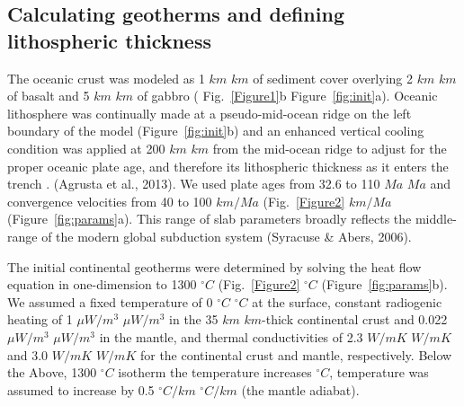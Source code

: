 \documentclass[draft,linenumbers]{agujournal2018} %
\providecommand{\DIFaddtex}[1]{{\protect\color{blue} \sf #1}} %
\providecommand{\DIFdeltex}[1]{{\protect\color{red} \scriptsize #1}} %
\providecommand{\DIFaddbegin}{} %
\providecommand{\DIFaddend}{} %
\providecommand{\DIFdelbegin}{} %
\providecommand{\DIFdelend}{} %
\providecommand{\DIFadd}[1]{\texorpdfstring{\DIFaddtex{#1}}{#1}} %
\providecommand{\DIFdel}[1]{\texorpdfstring{\DIFdeltex{#1}}{}} %
\newcommand{\DIFscaledelfig}{0.3}
\newlength{\DIFdelgraphicswidth} %
\newlength{\DIFdelgraphicsheight} %
\newcommand{\DIFaddincludegraphics}[2][]{{\color{blue}\fbox{\DIFOincludegraphics[#1]{#2}}}} %
\newcommand{\DIFdelincludegraphics}[2][]{%
\sbox{\DIFdelgraphicsbox}{\DIFOincludegraphics[#1]{#2}}%
\settoboxwidth{\DIFdelgraphicswidth}{\DIFdelgraphicsbox} %
\settoboxtotalheight{\DIFdelgraphicsheight}{\DIFdelgraphicsbox} %
\scalebox{\DIFscaledelfig}{%
\parbox[b]{\DIFdelgraphicswidth}{\usebox{\DIFdelgraphicsbox}\\[-\baselineskip] \rule{\DIFdelgraphicswidth}{0em}}\llap{\resizebox{\DIFdelgraphicswidth}{\DIFdelgraphicsheight}{%
\setlength{\unitlength}{\DIFdelgraphicswidth}%
\begin{picture}(1,1)%
\thicklines\linethickness{2pt} %
{\color[rgb]{1,0,0}\put(0,0){\framebox(1,1){}}}%
{\color[rgb]{1,0,0}\put(0,0){\line( 1,1){1}}}%
{\color[rgb]{1,0,0}\put(0,1){\line(1,-1){1}}}%
\end{picture}%
}\hspace*{3pt}}} %
} %
\DeclareRobustCommand{\DIFaddbegin}{\DIFOaddbegin \let\includegraphics\DIFaddincludegraphics} %
\DeclareRobustCommand{\DIFaddend}{\DIFOaddend \let\includegraphics\DIFOincludegraphics} %
\DeclareRobustCommand{\DIFdelbegin}{\DIFOdelbegin \let\includegraphics\DIFdelincludegraphics} %
\DeclareRobustCommand{\DIFdelend}{\DIFOaddend \let\includegraphics\DIFOincludegraphics} %
\begin{document}
\DIFaddend \subsection{Calculating geotherms and defining lithospheric thickness}
\DIFaddbegin

\DIFaddend The oceanic crust was modeled as 1 \DIFdelbegin \DIFdel{$km$ }\DIFdelend \DIFaddbegin \DIFadd{\(km\) }\DIFaddend of sediment cover overlying 2
\DIFdelbegin \DIFdel{$km$ }\DIFdelend \DIFaddbegin \DIFadd{\(km\) }\DIFaddend of basalt and 5 \DIFdelbegin \DIFdel{$km$ }\DIFdelend \DIFaddbegin \DIFadd{\(km\) }\DIFaddend of gabbro (\DIFdelbegin \DIFdel{Fig.~\ref{Figure1}b}\DIFdelend \DIFaddbegin \DIFadd{Figure~\ref{fig:init}a}\DIFaddend ).
Oceanic lithosphere was continually made at a pseudo-mid-ocean ridge on
the left boundary of the model \DIFaddbegin \DIFadd{(Figure~\ref{fig:init}b) }\DIFaddend and an enhanced
vertical cooling condition was applied at 200 \DIFdelbegin \DIFdel{$km$ }\DIFdelend \DIFaddbegin \DIFadd{\(km\) }\DIFaddend from the mid-ocean
ridge to adjust for the proper oceanic plate age, and therefore its
lithospheric thickness as it enters the trench \DIFdelbegin %
\DIFdel{.}\DIFdelend \DIFaddbegin \DIFadd{(Agrusta et al., 2013).
}\DIFaddend We used plate ages from 32.6 to 110 \DIFdelbegin \DIFdel{$Ma$ }\DIFdelend \DIFaddbegin \DIFadd{\(Ma\) }\DIFaddend and convergence velocities
from 40 to 100 \DIFdelbegin \DIFdel{$km/Ma$ (Fig.~\ref{Figure2}}\DIFdelend \DIFaddbegin \DIFadd{\(km/Ma\) (Figure~\ref{fig:params}}\DIFaddend a). This range of slab
parameters broadly reflects the middle-range of the modern global
subduction system \DIFdelbegin %
\DIFdelend \DIFaddbegin \DIFadd{(Syracuse \& Abers, 2006)}\DIFaddend .

The initial continental geotherms were determined by solving the heat
flow equation in one-dimension to 1300 \DIFdelbegin \DIFdel{$^{\circ}C$ (Fig.~\ref{Figure2}}\DIFdelend \DIFaddbegin \DIFadd{\(^{\circ}C\)
(Figure~\ref{fig:params}}\DIFaddend b). We assumed a fixed temperature of 0
\DIFdelbegin \DIFdel{$^{\circ}C$ }\DIFdelend \DIFaddbegin \DIFadd{\(^{\circ}C\) }\DIFaddend at the surface, constant radiogenic heating of 1
\DIFdelbegin \DIFdel{$\mu W/m^3$ }\DIFdelend \DIFaddbegin \DIFadd{\(\mu W/m^{3}\) }\DIFaddend in the 35 \DIFdelbegin \DIFdel{$km$}\DIFdelend \DIFaddbegin \DIFadd{\(km\)}\DIFaddend -thick continental crust and 0.022
\DIFdelbegin \DIFdel{$\mu W/m^3$ }\DIFdelend \DIFaddbegin \DIFadd{\(\mu W/m^{3}\) }\DIFaddend in the mantle, and thermal conductivities of 2.3
\DIFdelbegin \DIFdel{$W/mK$ }\DIFdelend \DIFaddbegin \DIFadd{\(W/mK\) }\DIFaddend and 3.0 \DIFdelbegin \DIFdel{$W/mK$ }\DIFdelend \DIFaddbegin \DIFadd{\(W/mK\) }\DIFaddend for the continental crust and mantle,
respectively. \DIFdelbegin \DIFdel{Below the }\DIFdelend \DIFaddbegin \DIFadd{Above, }\DIFaddend 1300 \DIFdelbegin \DIFdel{$^{\circ}C$ isotherm the temperature increases }\DIFdelend \DIFaddbegin \DIFadd{\(^{\circ}C\), temperature was assumed to
increase }\DIFaddend by 0.5 \DIFdelbegin \DIFdel{$^{\circ}C/km$ }\DIFdelend \DIFaddbegin \DIFadd{\(^{\circ}C/km\) }\DIFaddend (the mantle adiabat).
\end{document}
